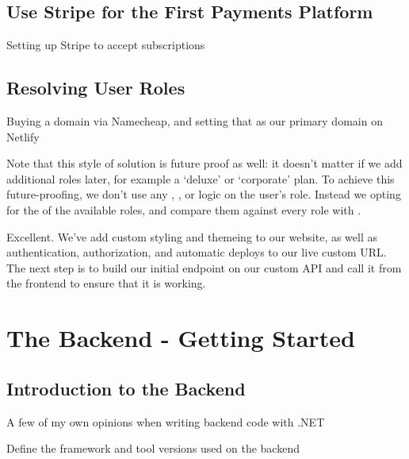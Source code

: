 \documentclass[a4paper,
                             oneside,
                             BCOR1.0cm,
                             DIV11,
                             parskip=full,
                             11pt]{scrbook}
\begin{document}
\section{Use Stripe for the First Payments Platform}\label{sec:titles}
\begin{arrows}
\item Setting up Stripe to accept subscriptions
\end{arrows}

\section{Resolving User Roles}\label{sec:titles}
\begin{arrows}
\item Buying a domain via Namecheap, and setting that as our primary domain on Netlify
\end{arrows}

Note that this style of solution is future proof as well: it doesn't matter if we add additional roles later, for example a `deluxe' or `corporate' plan. To achieve this future-proofing, we don't use any , , or  logic on the user's role. Instead we opting for the  of the available roles, and compare them against every role with .

Excellent. We've add custom styling and themeing to our website, as well as authentication, authorization, and automatic deploys to our live custom URL. The next step is to build our initial endpoint on our custom API and call it from the frontend to ensure that it is working.

\chapter{The Backend - Getting Started}\label{cap:primer}

\section{Introduction to the Backend}
\begin{arrows}
\item A few of my own opinions when writing backend code with .NET
\item Define the framework and tool versions used on the backend
\end{arrows}
\end{document}
